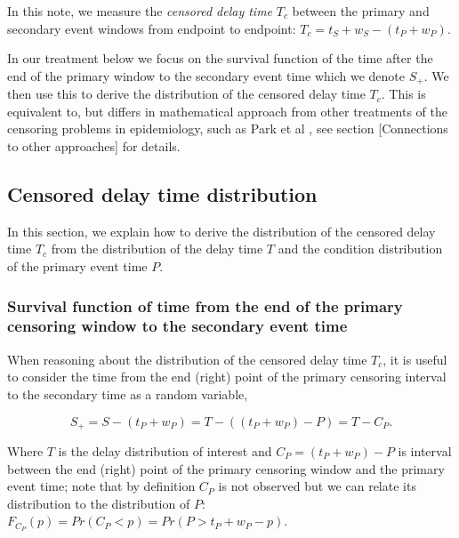 \documentclass[10pt,letterpaper]{article}
\begin{document}
In this note, we measure the \textit{censored delay time} $T_c$ between the primary and secondary event windows from endpoint to endpoint: $T_c = t_S + w_S - (t_P + w_P)$. 


In our treatment below we focus on the survival function of the time after the end of the primary window to the secondary event time which we denote $S_{+}$. We then use this to derive the distribution of the censored delay time $T_c$. This is equivalent to, but differs in mathematical approach from other treatments of the censoring problems in epidemiology, such as Park et al \cite{Park2024.01.12.24301247}, see section [Connections to other approaches] for details.

\subsection{Censored delay time distribution}
In this section, we explain how to derive the distribution of the censored delay time $T_c$ from the distribution of the delay time $T$ and the condition distribution of the primary event time $P$.

\subsubsection{Survival function of time from the end of the primary censoring window to the secondary event time}

When reasoning about the distribution of the censored delay time $T_c$, it is useful to consider the time from the end (right) point of the primary censoring interval to the secondary time as a random variable,

\begin{equation}
S_+ = S - (t_P + w_P) = T - ((t_P + w_P) - P) = T - C_P.
\end{equation}

Where $T$ is the delay distribution of interest and $C_P = (t_P + w_P) - P$ is interval between the end (right) point of the primary censoring window and the primary event time; note that by definition $C_P$ is not observed but we can relate its distribution to the distribution of $P$: $F_{C_P}(p) = Pr(C_P < p) = Pr(P > t_P + w_P - p)$.
\end{document}
